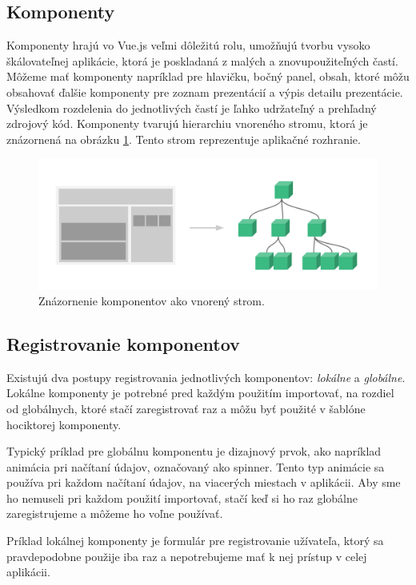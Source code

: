 \subsection*{Komponenty}
Komponenty hrajú vo Vue.js veľmi dôležitú rolu, umožňujú tvorbu vysoko škálovateľnej aplikácie, ktorá je poskladaná z malých a znovupoužiteľných častí. Môžeme mať komponenty napríklad pre hlavičku, bočný panel, obsah, ktoré môžu obsahovať ďalšie komponenty pre zoznam prezentácií a výpis detailu prezentácie. Výsledkom rozdelenia do jednotlivých častí je ľahko udržateľný a prehľadný zdrojový kód. Komponenty tvarujú hierarchiu vnoreného stromu, ktorá je znázornená na obrázku \ref{pic:components}. Tento strom reprezentuje aplikačné rozhranie.
    \begin{figure}[!hbt]
        \centering
        \includegraphics[scale=0.25]{obrazky/components.png}
        \caption{Znázornenie komponentov ako vnorený strom\cite{vue-guide}.}
        \label{pic:components}
    \end{figure}
    
\subsection*{Registrovanie komponentov}
Existujú dva postupy registrovania jednotlivých komponentov: \textit{lokálne} a \textit{globálne}. Lokálne komponenty je potrebné pred každým použitím importovať, na rozdiel od globálnych, ktoré stačí zaregistrovať raz a môžu byť použité v šablóne hociktorej komponenty. 

Typický príklad pre globálnu komponentu je dizajnový prvok, ako napríklad animácia pri načítaní údajov, označovaný ako spinner. Tento typ animácie sa používa pri každom načítaní údajov, na viacerých miestach v aplikácii. Aby sme ho nemuseli pri každom použití importovať, stačí keď si ho raz globálne zaregistrujeme a môžeme ho voľne používať. 

Príklad lokálnej komponenty je formulár pre registrovanie užívateľa, ktorý sa pravdepodobne použije iba raz a nepotrebujeme mať k nej prístup v celej aplikácii.

